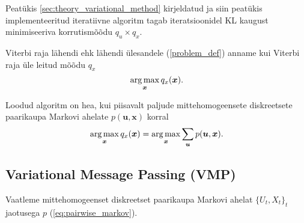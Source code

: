 Peatükis \ref{sec:theory_variational_method} kirjeldatud ja siin peatükis implementeeritud iteratiivne algoritm tagab iteratsioonidel KL kaugust minimiseeriva korrutismõõdu $q_u \times q_x$. 

Viterbi raja lähendi ehk lähendi ülesandele (\ref{problem_def}) anname kui Viterbi raja üle leitud mõõdu $q_x$
$$\operatorname*{arg\,max}_{\bm{x}} q_x(\bm{x}).$$


Loodud algoritm on hea, kui piisavalt paljude  mittehomogeensete diskreetsete paarikaupa Markovi ahelate $p(\bm{u},\bm{x})$ korral
$$ \operatorname*{arg\,max}_{\bm{x}} q_x(\bm{x}) = \operatorname*{arg\,max}_{\bm{x}} \sum_{\bm{u}} p(\bm{u},\bm{x}). $$

\subsection{Variational Message Passing (VMP)}\label{sec:VMP}

Vaatleme mittehomogeenset diskreetset paarikaupa Markovi ahelat $\{U_t,X_t\}_t$ jaotusega $p$ (\ref{eq:pairwise_markov}). 

